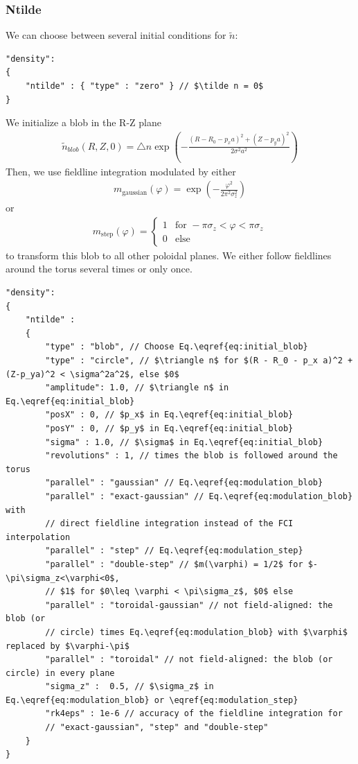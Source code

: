 \subsubsection{Ntilde} \label{sec:ntilde}
We can choose between several initial conditions for $\tilde n$:
\begin{verbatim}
"density":
{
    "ntilde" : { "type" : "zero" } // $\tilde n = 0$
}
\end{verbatim}

We initialize a blob in the R-Z plane
\begin{align} \label{eq:initial_blob}
  \tilde n_{blob}(R,Z,0) = \triangle n \exp\left( -\frac{(R - R_0 - p_x a)^2 + (Z-p_ya)^2}{2\sigma^2 a^2} \right)
\end{align}
Then, we use fieldline integration modulated by either
\begin{align} \label{eq:modulation_blob}
    m_{\text{gaussian}}(\varphi) = \exp\left( -\frac{\varphi^2 }{2\pi^2\sigma_z^2} \right)
\end{align}
or
\begin{align} \label{eq:modulation_step}
    m_{\text{step}}(\varphi) = \begin{cases}
        1 &\text{for } -\pi\sigma_z < \varphi < \pi \sigma_z \\
        0 & \text{else}
    \end{cases}
\end{align}
to transform this blob to all other poloidal planes.
We either follow fieldlines around the torus several times or only once.
\begin{verbatim}
"density":
{
    "ntilde" :
    {
        "type" : "blob", // Choose Eq.\eqref{eq:initial_blob}
        "type" : "circle", // $\triangle n$ for $(R - R_0 - p_x a)^2 + (Z-p_ya)^2 < \sigma^2a^2$, else $0$
        "amplitude": 1.0, // $\triangle n$ in Eq.\eqref{eq:initial_blob}
        "posX" : 0, // $p_x$ in Eq.\eqref{eq:initial_blob}
        "posY" : 0, // $p_y$ in Eq.\eqref{eq:initial_blob}
        "sigma" : 1.0, // $\sigma$ in Eq.\eqref{eq:initial_blob}
        "revolutions" : 1, // times the blob is followed around the torus
        "parallel" : "gaussian" // Eq.\eqref{eq:modulation_blob}
        "parallel" : "exact-gaussian" // Eq.\eqref{eq:modulation_blob} with
        // direct fieldline integration instead of the FCI interpolation
        "parallel" : "step" // Eq.\eqref{eq:modulation_step}
        "parallel" : "double-step" // $m(\varphi) = 1/2$ for $-\pi\sigma_z<\varphi<0$,
        // $1$ for $0\leq \varphi < \pi\sigma_z$, $0$ else
        "parallel" : "toroidal-gaussian" // not field-aligned: the blob (or
        // circle) times Eq.\eqref{eq:modulation_blob} with $\varphi$ replaced by $\varphi-\pi$
        "parallel" : "toroidal" // not field-aligned: the blob (or circle) in every plane
        "sigma_z" :  0.5, // $\sigma_z$ in Eq.\eqref{eq:modulation_blob} or \eqref{eq:modulation_step}
        "rk4eps" : 1e-6 // accuracy of the fieldline integration for
        // "exact-gaussian", "step" and "double-step"
    }
}
\end{verbatim}
